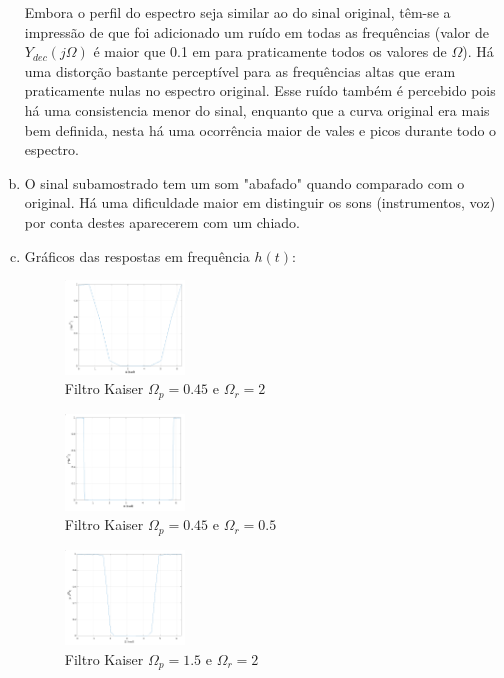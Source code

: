\documentclass{article}
\begin{document}
\begin{enumerate}[(a)]
        Embora o perfil do espectro seja similar ao do sinal original, têm-se a impressão de que foi adicionado um ruído em todas as frequências (valor de $Y_{dec}(j\Omega)$ é maior que 0.1 em para praticamente todos os valores de $\Omega$). Há uma distorção bastante perceptível para as frequências altas que eram praticamente nulas no espectro original. Esse ruído também é percebido pois há uma consistencia menor do sinal, enquanto que a curva original era mais bem definida, nesta há uma ocorrência maior de vales e picos durante todo o espectro.

\break\vfill

\item
    O sinal subamostrado tem um som "abafado" quando comparado com o original. Há uma dificuldade maior em distinguir os sons (instrumentos, voz) por conta destes aparecerem com um chiado. 

\item
    Gráficos das respostas em frequência $h(t)$:

    \begin{figure}[H]
    \centering
    \includegraphics[width=0.3\textwidth]{images/h1.png}
        \caption{Filtro Kaiser $\Omega_p = 0.45$ e $\Omega_r = 2$}
    \end{figure}

    \begin{figure}[H]
    \centering
    \includegraphics[width=0.3\textwidth]{images/h2.png}
        \caption{Filtro Kaiser $\Omega_p = 0.45$ e $\Omega_r = 0.5$}
    \end{figure}

    \begin{figure}[H]
    \centering
    \includegraphics[width=0.3\textwidth]{images/h3.png}
        \caption{Filtro Kaiser $\Omega_p = 1.5$ e $\Omega_r = 2$}
    \end{figure}


\end{enumerate}
\end{document}
